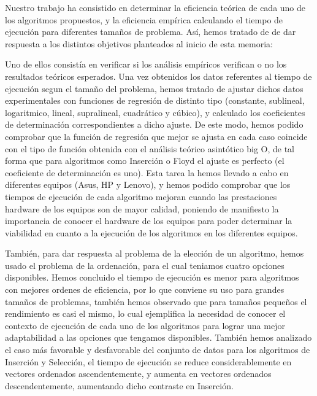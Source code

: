 \documentclass{homework}
\begin{document}
    Nuestro trabajo ha consistido en determinar la eficiencia teórica de cada uno de los algoritmos propuestos, y la eficiencia empírica calculando
    el tiempo de ejecución para diferentes tamaños de problema. Así, hemos tratado de de dar respuesta a los distintos objetivos planteados al inicio
    de esta memoria:

    Uno de ellos consistía en verificar si los análisis empíricos verifican o no los resultados teóricos esperados. Una vez obtenidos los datos 
    referentes al tiempo de ejecución segun el tamaño del problema, hemos tratado de ajustar dichos datos experimentales con funciones de regresión de 
    distinto tipo (constante, sublineal, logaritmico, lineal, supralineal, cuadrático y cúbico), y calculado los coeficientes de determinación correspondientes
    a dicho ajuste. De este modo, hemos podido comprobar que la función de regresión que mejor se ajusta en cada caso coincide con el tipo de función
    obtenida con el análisis teórico asintótico big O, de tal forma que para algoritmos como Inserción o Floyd el ajuste es perfecto (el coeficiente de 
    determinación es uno). Esta tarea la hemos llevado a cabo en diferentes equipos (Asus, HP y Lenovo), y hemos podido comprobar que los tiempos de 
    ejecución de cada algoritmo mejoran cuando las prestaciones hardware de los equipos son de mayor calidad, poniendo de manifiesto la importancia de conocer
    el hardware de los equipos para poder determinar la viabilidad en cuanto a la ejecución de los algoritmos en los diferentes equipos. 

    También, para dar respuesta al problema de la elección de un algoritmo, hemos usado el problema de la ordenación, para el cual teniamos cuatro 
    opciones disponibles. Hemos concluido el tiempo de ejecución es menor para algoritmos con mejores ordenes de eficiencia, por lo que conviene su 
    uso para grandes tamaños de problemas, también hemos observado que para tamaños pequeños el rendimiento es casi el mismo, lo cual ejemplifica la
    necesidad de conocer el contexto de ejecución de cada uno de los algoritmos para lograr una mejor adaptabilidad a las opciones que tengamos disponibles.
    También hemos analizado el caso más favorable y desfavorable del conjunto de datos para los algoritmos de Inserción y Selección, el tiempo de ejecución se 
    reduce considerablemente en vectores ordenados ascendentemente, y aumenta en vectores ordenados descendentemente, aumentando dicho contraste en Inserción. 
    
\end{document}
